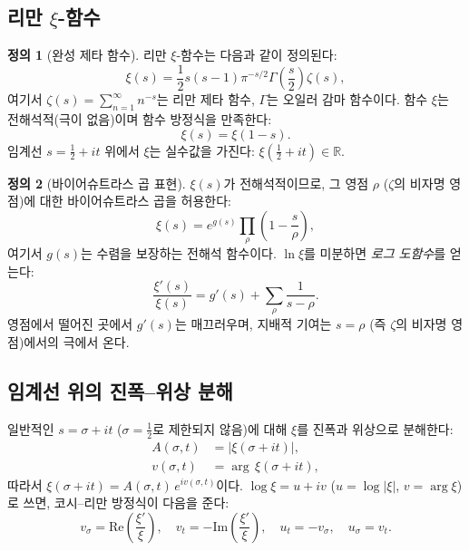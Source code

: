 \documentclass[11pt, a4paper]{article}
\theoremstyle{definition}
\newtheorem{definition}{정의}[section]
\theoremstyle{plain}
\newcommand{\xif}{\xi}
\newcommand{\Ampl}{A}
\begin{document}
\subsection{리만 $\xif$-함수}

\begin{definition}[완성 제타 함수]
\label{def:xi}
리만 $\xif$-함수는 다음과 같이 정의된다:
\begin{equation}
  \xif(s) = \frac{1}{2}s(s-1)\pi^{-s/2}\Gamma\!\left(\frac{s}{2}\right)\zeta(s),
  \label{eq:xi_def}
\end{equation}
여기서 $\zeta(s) = \sum_{n=1}^{\infty}n^{-s}$는 리만 제타 함수, $\Gamma$는 오일러 감마 함수이다. 함수 $\xif$는 전해석적(극이 없음)이며 함수 방정식을 만족한다:
\begin{equation}
  \xif(s) = \xif(1-s).
  \label{eq:func_eq}
\end{equation}
임계선 $s = \tfrac{1}{2} + it$ 위에서 $\xif$는 실수값을 가진다: $\xif(\tfrac{1}{2}+it) \in \mathbb{R}$.
\end{definition}

\begin{definition}[바이어슈트라스 곱 표현]
\label{def:weierstrass}
$\xif(s)$가 전해석적이므로, 그 영점 $\rho$ ($\zeta$의 비자명 영점)에 대한 바이어슈트라스 곱을 허용한다:
\begin{equation}
  \xif(s) = e^{g(s)}\prod_{\rho}
  \left(1 - \frac{s}{\rho}\right),
  \label{eq:weierstrass}
\end{equation}
여기서 $g(s)$는 수렴을 보장하는 전해석 함수이다. $\ln\xif$를 미분하면 \textit{로그 도함수}를 얻는다:
\begin{equation}
  \frac{\xif'(s)}{\xif(s)} = g'(s) + \sum_{\rho}
  \frac{1}{s - \rho}.
  \label{eq:log_deriv}
\end{equation}
영점에서 떨어진 곳에서 $g'(s)$는 매끄러우며, 지배적 기여는 $s = \rho$ (즉 $\zeta$의 비자명 영점)에서의 극에서 온다.
\end{definition}


\subsection{임계선 위의 진폭--위상 분해}
\label{sec:amp_phase}

일반적인 $s = \sigma + it$ ($\sigma = \tfrac{1}{2}$로 제한되지 않음)에 대해 $\xif$를 진폭과 위상으로 분해한다:
\begin{align}
  \Ampl(\sigma, t) &= |\xif(\sigma + it)|,
  \label{eq:amplitude}\\
  v(\sigma, t) &= \arg\,\xif(\sigma + it),
  \label{eq:phase_general}
\end{align}
따라서 $\xif(\sigma + it) = \Ampl(\sigma,t)\,e^{iv(\sigma,t)}$이다.
$\log\xif = u + iv$ ($u = \log|\xif|$, $v = \arg\xif$)로 쓰면, 코시--리만 방정식이 다음을 준다:
\begin{equation}
  v_\sigma = \mathrm{Re}\!\left(\frac{\xif'}{\xif}\right), \quad
  v_t = -\mathrm{Im}\!\left(\frac{\xif'}{\xif}\right), \quad
  u_t = -v_\sigma, \quad u_\sigma = v_t.
  \label{eq:cauchy_riemann}
\end{equation}
\end{document}
